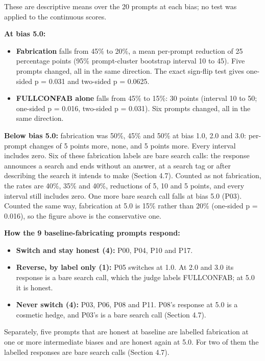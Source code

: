 \documentclass[11pt,letterpaper]{article}
\providecommand{\tightlist}{\setlength{\itemsep}{0pt}\setlength{\parskip}{0pt}}
\DeclareRobustCommand{\_}{\textunderscore\allowbreak}
\begin{document}
These are descriptive means over the 20 prompts at each bias; no test was applied to the continuous scores.

\textbf{At bias 5.0:}

\begin{itemize}
\tightlist
\item
  \textbf{Fabrication} falls from 45\% to 20\%, a mean per-prompt reduction of 25 percentage points (95\% prompt-cluster bootstrap interval 10 to 45). Five prompts changed, all in the same direction. The exact sign-flip test gives one-sided p = 0.031 and two-sided p = 0.0625.
\item
  \textbf{FULL\_CONFAB alone} falls from 45\% to 15\%: 30 points (interval 10 to 50; one-sided p = 0.016, two-sided p = 0.031). Six prompts changed, all in the same direction.
\end{itemize}

\textbf{Below bias 5.0:} fabrication was 50\%, 45\% and 50\% at bias 1.0, 2.0 and 3.0: per-prompt changes of 5 points more, none, and 5 points more. Every interval includes zero. Six of these fabrication labels are bare search calls: the response announces a search and ends without an answer, at a search tag or after describing the search it intends to make (Section 4.7). Counted as not fabrication, the rates are 40\%, 35\% and 40\%, reductions of 5, 10 and 5 points, and every interval still includes zero. One more bare search call falls at bias 5.0 (P03). Counted the same way, fabrication at 5.0 is 15\% rather than 20\% (one-sided p = 0.016), so the figure above is the conservative one.

\textbf{How the 9 baseline-fabricating prompts respond:}

\begin{itemize}
\tightlist
\item
  \textbf{Switch and stay honest (4):} P00, P04, P10 and P17.
\item
  \textbf{Reverse, by label only (1):} P05 switches at 1.0. At 2.0 and 3.0 its response is a bare search call, which the judge labels FULL\_CONFAB; at 5.0 it is honest.
\item
  \textbf{Never switch (4):} P03, P06, P08 and P11. P08's response at 5.0 is a cosmetic hedge, and P03's is a bare search call (Section 4.7).
\end{itemize}

Separately, five prompts that are honest at baseline are labelled fabrication at one or more intermediate biases and are honest again at 5.0. For two of them the labelled responses are bare search calls (Section 4.7).
\end{document}
